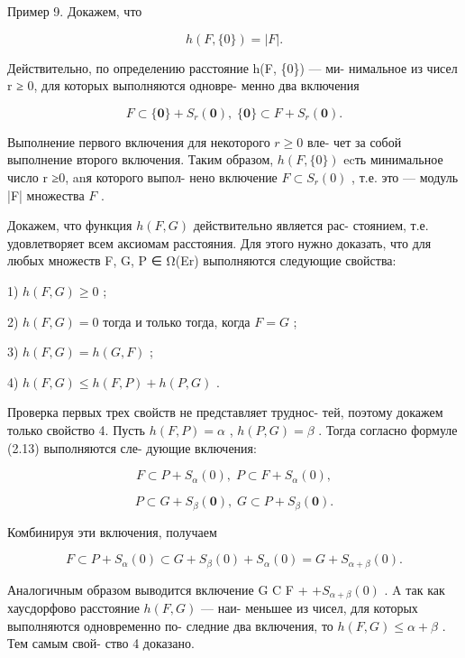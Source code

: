 \documentclass[8pt]{extarticle}
\begin{document}
Пример 9. Докажем, что

\[
h\left( {F,\{ 0\} }\right)  = \left| F\right| .
\]

Действительно, по определению расстояние h(F, \{0\}) — ми- нимальное из чисел r ≥ 0, для которых выполняются одновре- менно два включения

\[
F \subset  \{ \mathbf{0}\}  + {S}_{r}\left( \mathbf{0}\right) ,\;\{ \mathbf{0}\}  \subset  F + {S}_{r}\left( \mathbf{0}\right) .
\]

Выполнение первого включения для некоторого \(r \geq  0\) вле- чет за собой выполнение второго включения. Таким образом, \(h\left( {F,\{ 0\} }\right)\) ecть минимальное число r ≥0, anя которого выпол- нено включение \(F \subset  {S}_{r}\left( 0\right)\) , т.е. это — модуль |F| множества \(F\) .

Докажем, что функция \(h\left( {F,G}\right)\) действительно является рас- стоянием, т.е. удовлетворяет всем аксиомам расстояния. Для этого нужно доказать, что для любых множеств F, G, P ∈ Ω(Er) выполняются следующие свойства:

1) \(h\left( {F,G}\right)  \geq  0\) ;

2) \(h\left( {F,G}\right)  = 0\) тогда и только тогда, когда \(F = G\) ;

3) \(h\left( {F,G}\right)  = h\left( {G,F}\right)\) ;

4) \(h\left( {F,G}\right)  \leq  h\left( {F,P}\right)  + h\left( {P,G}\right)\) .

Проверка первых трех свойств не представляет труднос- тей, поэтому докажем только свойство 4. Пусть \(h\left( {F,P}\right)  = \alpha\) , \(h\left( {P,G}\right)  = \beta\) . Тогда согласно формуле (2.13) выполняются сле- дующие включения:

\[
F \subset  P + {S}_{\alpha }\left( 0\right) ,\;P \subset  F + {S}_{\alpha }\left( 0\right) ,
\]

\[
P \subset  G + {S}_{\beta }\left( \mathbf{0}\right) ,\;G \subset  P + {S}_{\beta }\left( \mathbf{0}\right) .
\]

Комбинируя эти включения, получаем

\[
F \subset  P + {S}_{\alpha }\left( 0\right)  \subset  G + {S}_{\beta }\left( 0\right)  + {S}_{\alpha }\left( 0\right)  = G + {S}_{\alpha  + \beta }\left( 0\right) .
\]

Аналогичным образом выводится включение G C F + \(+ {S}_{\alpha  + \beta }\left( 0\right)\) . A так как хаусдорфово расстояние \(h\left( {F,G}\right)\) — наи- меньшее из чисел, для которых выполняются одновременно по- следние два включения, то \(h\left( {F,G}\right)  \leq  \alpha  + \beta\) . Тем самым свой- ство 4 доказано.
\end{document}
